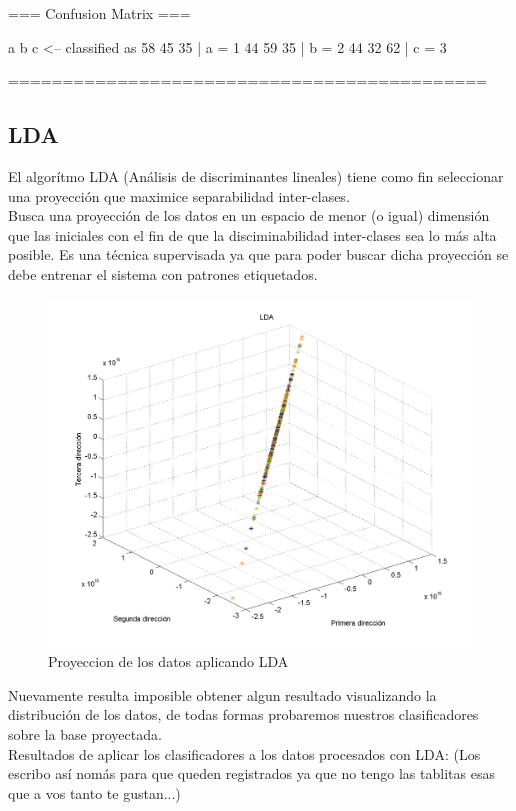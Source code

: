 \documentclass[12pt,a4paper,titlepage]{report}
\begin{document}
=== Confusion Matrix ===

  a  b  c   <-- classified as
 58 45 35 |  a = 1
 44 59 35 |  b = 2
 44 32 62 |  c = 3

  ============================================\\
 	
\subsection{LDA}

El algorítmo LDA (Análisis de discriminantes lineales) tiene como fin seleccionar una proyección que maximice separabilidad inter-clases.\\
Busca una proyección de los datos en un espacio de menor (o igual) dimensión que las iniciales con el fin de que la disciminabilidad inter-clases sea lo más alta posible. Es una técnica supervisada ya que para poder buscar dicha proyección se debe entrenar el sistema con patrones etiquetados.\\

\begin{figure}[H]
	\centering 
	\includegraphics[width=.8\textwidth]{pics/lda}
	\caption{Proyeccion de los datos aplicando LDA}
	\label{fig:lda}
\end{figure}

Nuevamente resulta imposible obtener algun resultado visualizando la distribución de los datos, de todas formas probaremos nuestros clasificadores sobre la base proyectada.\\ 

Resultados de aplicar los clasificadores a los datos procesados con LDA: (Los escribo así nomás para que queden registrados ya que no tengo las tablitas esas que a vos tanto te gustan...)\\	
\end{document}
